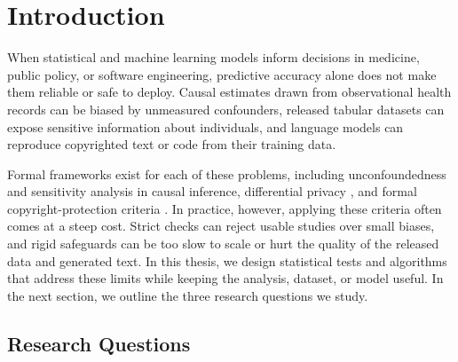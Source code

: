 \chapter{Introduction}
\label{chap:introduction}

When statistical and machine learning models inform decisions in medicine, public policy, or software engineering, predictive accuracy alone does not make them reliable or safe to deploy. Causal estimates drawn from observational health records can be biased by unmeasured confounders, released tabular datasets can expose sensitive information about individuals, and language models can reproduce copyrighted text or code from their training data.

Formal frameworks exist for each of these problems, including unconfoundedness and sensitivity analysis in causal inference, differential privacy \citep{dp}, and formal copyright-protection criteria \citep{vyas2023provable}. In practice, however, applying these criteria often comes at a steep cost. Strict checks can reject usable studies over small biases, and rigid safeguards can be too slow to scale or hurt the quality of the released data and generated text. In this thesis, we design statistical tests and algorithms that address these limits while keeping the analysis, dataset, or model useful. In the next section, we outline the three research questions we study.

\section{Research Questions}
\label{sec:intro-settings}

